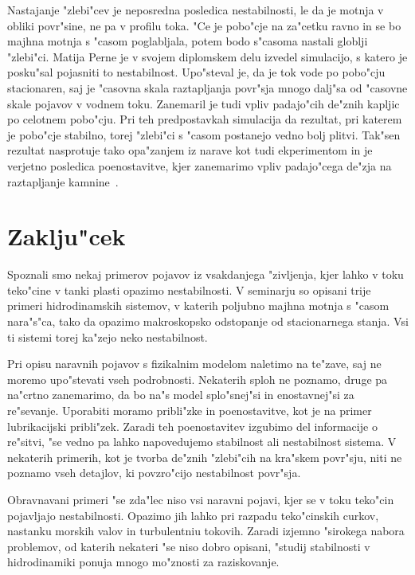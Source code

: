 \documentclass[a4paper,12pt]{article}
\begin{document}
Nastajanje "zlebi"cev je neposredna posledica nestabilnosti, le da je motnja v obliki povr"sine, ne pa v profilu toka. "Ce je pobo"cje na za"cetku ravno in se bo majhna motnja s "casom poglabljala, potem bodo s"casoma nastali globlji "zlebi"ci. Matija Perne je v svojem diplomskem delu izvedel simulacijo, s katero je posku"sal pojasniti to nestabilnost. Upo"steval je, da je tok vode po pobo"cju stacionaren, saj je "casovna skala raztapljanja povr"sja mnogo dalj"sa od "casovne skale pojavov v vodnem toku. Zanemaril je tudi vpliv padajo"cih de"znih kapljic po celotnem pobo"cju. Pri teh predpostavkah simulacija da rezultat, pri katerem je pobo"cje stabilno, torej "zlebi"ci s "casom postanejo vedno bolj plitvi. Tak"sen rezultat nasprotuje tako opa"zanjem iz narave kot tudi ekperimentom in je verjetno posledica poenostavitve, kjer zanemarimo vpliv padajo"cega de"zja na raztapljanje kamnine~\cite{perne}. 

\section{Zaklju"cek}

Spoznali smo nekaj primerov pojavov iz vsakdanjega "zivljenja, kjer lahko v toku teko"cine v tanki plasti opazimo nestabilnosti. V seminarju so opisani trije primeri hidrodinamskih sistemov, v katerih poljubno majhna motnja s "casom nara"s"ca, tako da opazimo makroskopsko odstopanje od stacionarnega stanja. Vsi ti sistemi torej ka"zejo neko nestabilnost. 

Pri opisu naravnih pojavov s fizikalnim modelom naletimo na te"zave, saj ne moremo upo"stevati vseh podrobnosti. Nekaterih sploh ne poznamo, druge pa na"crtno zanemarimo, da bo na"s model splo"snej"si in enostavnej"si za re"sevanje. Uporabiti moramo pribli"zke in poenostavitve, kot je na primer lubrikacijski pribli"zek. Zaradi teh poenostavitev izgubimo del informacije o re"sitvi, "se vedno pa lahko napovedujemo stabilnost ali nestabilnost sistema. V nekaterih primerih, kot je tvorba de"znih "zlebi"cih na kra"skem povr"sju, niti ne poznamo vseh detajlov, ki povzro"cijo nestabilnost povr"sja. 

Obravnavani primeri "se zda"lec niso vsi naravni pojavi, kjer se v toku teko"cin pojavljajo nestabilnosti. Opazimo jih lahko pri razpadu teko"cinskih curkov, nastanku morskih valov in turbulentniu tokovih. Zaradi izjemno "sirokega nabora problemov, od katerih nekateri "se niso dobro opisani, "studij stabilnosti v hidrodinamiki ponuja mnogo mo"znosti za raziskovanje. 
\end{document}
